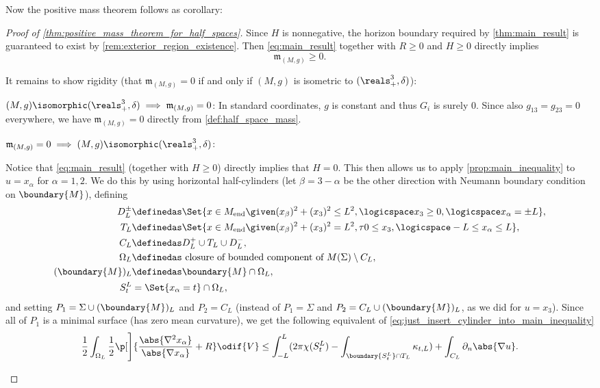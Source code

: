\documentclass[titlepage,numbers=noenddot,headinclude,oneside,%
footinclude=true,cleardoublepage=empty,%
BCOR=5mm,paper=a4,fontsize=11pt,%
english,%
]{scrartcl}
\newcommand{\Mend}{M_{\mathrm{end}}} %
\newcommand{\mass}[2]{\mathfrak{m}_{(#1,#2)}} %
\begin{document}
Now the positive mass theorem follows as corollary:
\begin{proof}[Proof of \cref{thm:positive_mass_theorem_for_half_spaces}]
    Since \( H \) is nonnegative, the horizon boundary required by \cref{thm:main_result} is guaranteed to exist by \cref{rem:exterior_region_existence}. Then \cref{eq:main_result} together with \( R\geq 0 \) and \( H\geq 0 \) directly implies
    \begin{equation*}
        \mass{M}{g}\geq 0.
    \end{equation*}

    It remains to show rigidity (\ie that \( \mass{M}{g}=0 \) if and only if \( (M,g)\) is isometric to \( (\reals^3_{+},\delta) \)):
    \begin{proofdescription}
        \item{\( (M,g)\isomorphic(\reals^3_{+},\delta) \implies \mass{M}{g}=0   \):} In standard coordinates, \( g \) is constant and thus \( G_i \) is surely \( 0 \). Since also \( g_{13}=g_{23}=0 \) everywhere, we have \( \mass{M}{g}=0 \) directly from \cref{def:half_space_mass}. 
        \item{\(  \mass{M}{g}=0 \implies (M,g)\isomorphic(\reals^3_{+},\delta) \):} 

        Notice that \cref{eq:main_result} (together with \( H\geq 0 \)) directly implies that \( H=0 \). This then allows us to apply \cref{prop:main_inequality} to \( u=x_{\alpha} \) for \( \alpha=1,2 \). We do this by using horizontal half-cylinders (let \( \beta=3-\alpha \) be the other direction with Neumann boundary condition on \( \boundary{M} \)), defining
        \begin{align*}
            D_L^{\pm}&\definedas\Set{x\in \Mend\given (x_\beta)^2+(x_3)^2\leq L^2,\logicspace x_3\geq 0,\logicspace x_\alpha=\pm L},\\
            T_L&\definedas\Set{x\in \Mend\given (x_\beta)^2+(x_3)^2=L^2,\tau 0\leq x_3,\logicspace -L\leq x_\alpha\leq L},\\
            C_L&\definedas D_L^+\cup T_L \cup D_L^-,\\
            \Omega_L&\definedas \text{ closure of bounded component of } M(\Sigma)\setminus C_L,\\
            (\boundary{M})_L&\definedas \boundary{M}\cap \Omega_L,\\
            S_t^L&=\Set{x_\alpha=t}\cap \Omega_L,
        \end{align*} 
        and setting \( P_1=\Sigma\cup (\boundary{M})_L \) and \( P_2=C_L \) (instead of \( P_1=\Sigma \) and \( P_2=C_L\cup (\boundary{M})_L \), as we did for \( u=x_3 \)). Since all of \( P_1 \) is a minimal surface (has zero mean curvature), we get the following equivalent of \cref{eq:just_insert_cylinder_into_main_inequality}
        \begin{equation*}
            \frac{1}{2}\int_{\Omega_L}\frac{1}{2}\p[\Bigg]{\frac{\abs{\nabla^2 x_\alpha}}{\abs{\nabla x_\alpha}}+R}\odif{V}\leq \int_{-L}^L(2\pi \chi(S_t^L)-\int_{\boundary{S_t^L}\cap  T_L}\kappa_{t,L})+\int_{C_L} \partial_n \abs{\nabla u}.
        \end{equation*}


\end{proofdescription}
\end{proof}
\end{document}

